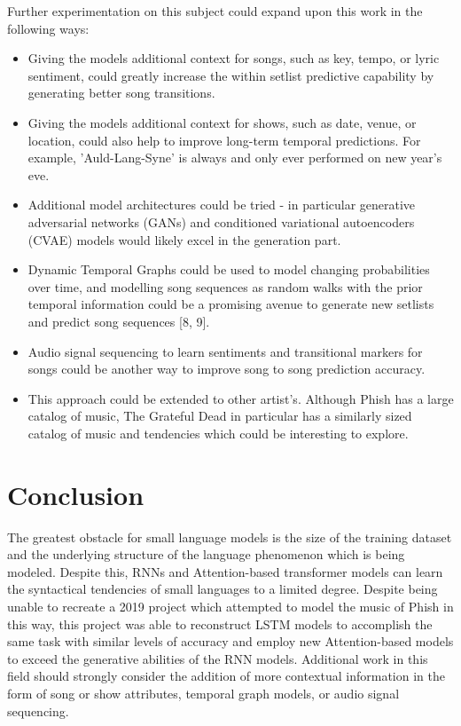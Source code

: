 \documentclass{article}
\begin{document}
Further experimentation on this subject could expand upon this work in the following ways:
\begin{itemize}
	\item Giving the models additional context for songs, such as key, tempo, or lyric sentiment, could greatly increase the within setlist predictive capability by generating better song transitions.
	\item Giving the models additional context for shows, such as date, venue, or location, could also help to improve long-term temporal predictions. For example, 'Auld-Lang-Syne' is always and only ever performed on new year's eve. 
	\item Additional model architectures could be tried - in particular generative adversarial networks (GANs) and conditioned variational autoencoders (CVAE) models would likely excel in the generation part.
	\item Dynamic Temporal Graphs could be used to model changing probabilities over time, and modelling song sequences as random walks with the prior temporal information could be a promising avenue to generate new setlists and predict song sequences [8, 9]. 
	\item Audio signal sequencing to learn sentiments and transitional markers for songs could be another way to improve song to song prediction accuracy. 
	\item This approach could be extended to other artist's. Although Phish has a large catalog of music, The Grateful Dead in particular has a similarly sized catalog of music and tendencies which could be interesting to explore. 
\end{itemize} 

\section{Conclusion}

The greatest obstacle for small language models is the size of the training dataset and the underlying structure of the language phenomenon which is being modeled. Despite this, RNNs and Attention-based transformer models can learn the syntactical tendencies of small languages to a limited degree. Despite being unable to recreate a 2019 project which attempted to model the music of Phish in this way, this project was able to reconstruct LSTM models to accomplish the same task with similar levels of accuracy and employ new Attention-based models to exceed the generative abilities of the RNN models. Additional work in this field should strongly consider the addition of more contextual information in the form of song or show attributes, temporal graph models, or audio signal sequencing.
\end{document}
